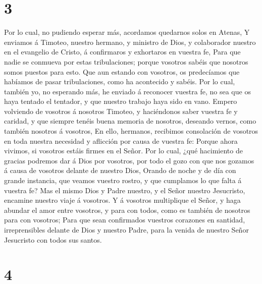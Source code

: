 \hypertarget{section-2}{%
\section{3}\label{section-2}}

 Por lo cual, no pudiendo esperar más, acordamos quedarnos
solos en Atenas,  Y enviamos á Timoteo, nuestro hermano, y
ministro de Dios, y colaborador nuestro en el evangelio de Cristo, á
confirmaros y exhortaros en vuestra fe,  Para que nadie se
conmueva por estas tribulaciones; porque vosotros sabéis que nosotros
somos puestos para esto.  Que aun estando con vosotros, os
predecíamos que habíamos de pasar tribulaciones, como ha acontecido y
sabéis.  Por lo cual, también yo, no esperando más, he
enviado á reconocer vuestra fe, no sea que os haya tentado el tentador,
y que nuestro trabajo haya sido en vano.  Empero volviendo
de vosotros á nosotros Timoteo, y haciéndonos saber vuestra fe y
caridad, y que siempre tenéis buena memoria de nosotros, deseando
vernos, como también nosotros á vosotros,  En ello,
hermanos, recibimos consolación de vosotros en toda nuestra necesidad y
aflicción por causa de vuestra fe:  Porque ahora vivimos, si
vosotros estáis firmes en el Señor.  Por lo cual, ¿qué
hacimiento de gracias podremos dar á Dios por vosotros, por todo el gozo
con que nos gozamos á causa de vosotros delante de nuestro Dios,
 Orando de noche y de día con grande instancia, que veamos
vuestro rostro, y que cumplamos lo que falta á vuestra fe? 
Mas el mismo Dios y Padre nuestro, y el Señor nuestro Jesucristo,
encamine nuestro viaje á vosotros.  Y á vosotros
multiplique el Señor, y haga abundar el amor entre vosotros, y para con
todos, como es también de nosotros para con vosotros;  Para
que sean confirmados vuestros corazones en santidad, irreprensibles
delante de Dios y nuestro Padre, para la venida de nuestro Señor
Jesucristo con todos sus santos.

\hypertarget{section-3}{%
\section{4}\label{section-3}}

